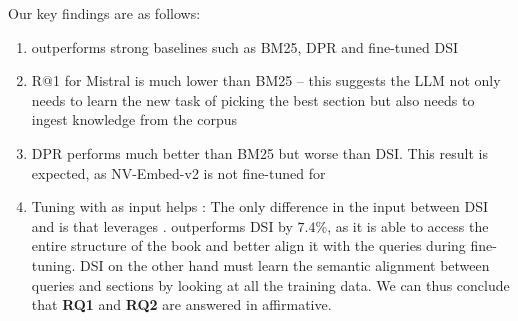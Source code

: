 \noindent Our key findings are as follows:
\begin{enumerate}
    \item {\sys} outperforms strong baselines such as BM25, DPR and fine-tuned DSI
    \item R@1 for Mistral is much lower than BM25 -- this suggests the LLM not only needs to learn the new task of picking the best section but also needs to ingest knowledge from the corpus
    \item DPR performs much better than BM25 but worse than DSI. This result is expected, as NV-Embed-v2 is not fine-tuned for {\ben}
    \item Tuning with {\toc} as input helps {\sys}: The only difference in the input between DSI and {\sys} is that {\sys} leverages {\toc}. {\sys} outperforms DSI by $7.4\%$, as it is able to access the entire structure of the book and better align it with the queries during fine-tuning. DSI on the other hand must learn the semantic alignment between queries and sections by looking at all the training data. We can thus conclude that \textbf{RQ1} and \textbf{RQ2} are answered in affirmative.
\end{enumerate}
 




